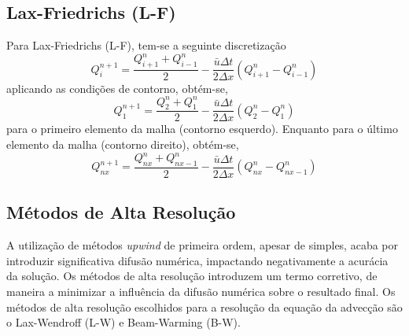 \subsection{Lax-Friedrichs (L-F)}
Para Lax-Friedrichs (L-F), tem-se a seguinte discretização
\begin{equation}\label{L-F}
    Q_i^{n+1} = \frac{Q_{i+1}^n + Q_{i-1}^n}{2}
    - \frac{\bar{u}\Delta t}{2\Delta x}\left(
    Q_{i+1}^n - Q_{i-1}^n
    \right)
\end{equation}
aplicando as condições de contorno, obtém-se,
\begin{equation}
    Q_1^{n+1} = \frac{Q_2^n + Q_1^n}{2}
    - \frac{\bar{u}\Delta t}{2\Delta x}\left(
    Q_2^n - Q_1^n
    \right)
\end{equation}
para o primeiro elemento da malha (contorno esquerdo). Enquanto para o último
elemento da malha (contorno direito), obtém-se,
\begin{equation}
    Q_{nx}^{n+1} = \frac{Q_{nx}^n + Q_{nx-1}^n}{2}
    - \frac{\bar{u}\Delta t}{2\Delta x}\left(
    Q_{nx}^n - Q_{nx-1}^n
    \right)
\end{equation}

\subsection{Métodos de Alta Resolução}
A utilização de métodos \textit{upwind} de primeira ordem, apesar de simples,
acaba por introduzir significativa difusão numérica, impactando negativamente a
acurácia da solução. Os métodos de alta resolução introduzem um termo
corretivo, de maneira a minimizar a influência da difusão numérica sobre o
resultado final. Os métodos de alta resolução escolhidos para a resolução da
equação da advecção são o Lax-Wendroff (L-W) e Beam-Warming (B-W).

